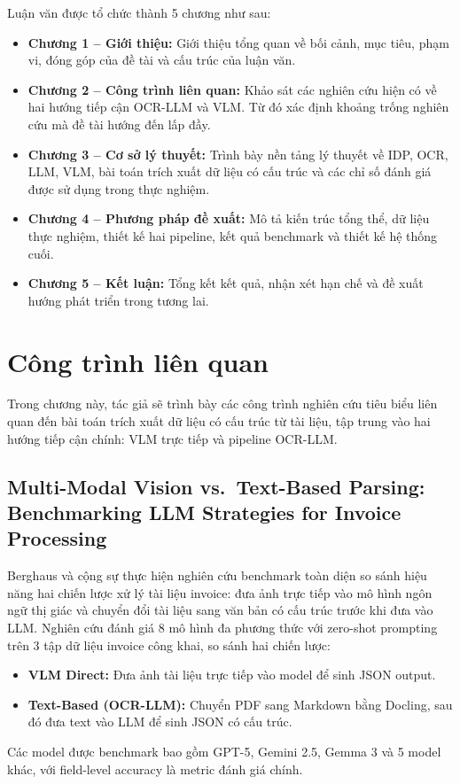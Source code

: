 ﻿\documentclass[12pt]{report}
\begin{document}
Luận văn được tổ chức thành 5 chương như sau:

\begin{itemize}
    \item \textbf{Chương 1 -- Giới thiệu:} Giới thiệu tổng quan về bối cảnh, mục tiêu, phạm vi, đóng góp của đề tài và cấu trúc của luận văn.
    \item \textbf{Chương 2 -- Công trình liên quan:} Khảo sát các nghiên cứu hiện có về hai hướng tiếp cận OCR-LLM và VLM. Từ đó xác định khoảng trống nghiên cứu mà đề tài hướng đến lấp đầy.
    \item \textbf{Chương 3 -- Cơ sở lý thuyết:} Trình bày nền tảng lý thuyết về IDP, OCR, LLM, VLM, bài toán trích xuất dữ liệu có cấu trúc và các chỉ số đánh giá được sử dụng trong thực nghiệm.
    \item \textbf{Chương 4 -- Phương pháp đề xuất:} Mô tả kiến trúc tổng thể, dữ liệu thực nghiệm, thiết kế hai pipeline, kết quả benchmark và thiết kế hệ thống cuối.
    \item \textbf{Chương 5 -- Kết luận:} Tổng kết kết quả, nhận xét hạn chế và đề xuất hướng phát triển trong tương lai.
\end{itemize}

\clearpage

\chapter{Công trình liên quan}

Trong chương này, tác giả sẽ trình bày các công trình nghiên cứu tiêu biểu liên quan đến bài toán trích xuất dữ liệu có cấu trúc từ tài liệu, tập trung vào hai hướng tiếp cận chính: VLM trực tiếp và pipeline OCR-LLM.

\section[Multi-Modal Vision vs.\ Text-Based Parsing]{Multi-Modal Vision vs.\ Text-Based Parsing: Benchmarking LLM Strategies for Invoice Processing}\label{sec:rw_berghaus}

Berghaus và cộng sự \cite{berghaus2025invoice} thực hiện nghiên cứu benchmark toàn diện so sánh hiệu năng hai chiến lược xử lý tài liệu invoice: đưa ảnh trực tiếp vào mô hình ngôn ngữ thị giác và chuyển đổi tài liệu sang văn bản có cấu trúc trước khi đưa vào LLM. Nghiên cứu đánh giá 8 mô hình đa phương thức với zero-shot prompting trên 3 tập dữ liệu invoice công khai, so sánh hai chiến lược:
\begin{itemize}
    \item \textbf{VLM Direct:} Đưa ảnh tài liệu trực tiếp vào model để sinh JSON output.
    \item \textbf{Text-Based (OCR-LLM):} Chuyển PDF sang Markdown bằng Docling, sau đó đưa text vào LLM để sinh JSON có cấu trúc.
\end{itemize}
Các model được benchmark bao gồm GPT-5, Gemini 2.5, Gemma 3 và 5 model khác, với field-level accuracy là metric đánh giá chính.
\end{document}
